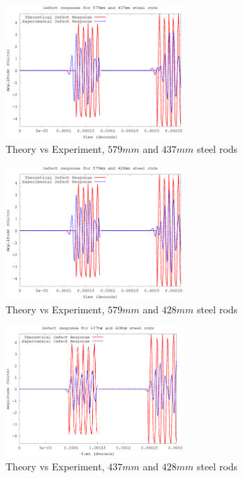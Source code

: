 \begin{figure}[ht!]
\centering
\includegraphics[width=0.6\textwidth]{eps_pics/steel-1-2_Iter_th_exp.eps}
\caption{Theory vs Experiment, $579 mm$ and $437 mm$ steel rods
	 \label{fig:steelThExp1}} 
\end{figure}

\begin{figure}[ht!]
\centering
\includegraphics[width=0.6\textwidth]{eps_pics/steel-1-3_Iter_th_exp.eps}
\caption{Theory vs Experiment, $579 mm$ and $428 mm$ steel rods
	 \label{fig:steelThExp2}} 
\end{figure}

\begin{figure}[ht!]
\centering
\includegraphics[width=0.6\textwidth]{eps_pics/steel-2-3_Iter_th_exp.eps}
\caption{Theory vs Experiment, $437 mm$ and $428 mm$ steel rods
	 \label{fig:steelThExp3}} 
\end{figure}


